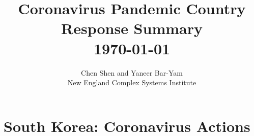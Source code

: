 \documentclass[onecolumn,journal]{IEEEtran}
\begin{document}
\title{\color{Brown} Coronavirus Pandemic Country Response Summary \\ \today \vspace{-0.35ex}}
\author{Chen Shen and Yaneer Bar-Yam \\ New England Complex Systems Institute  
  \vspace{-10ex} \\ 
   
   
\bigskip
\textbf{}
 }
    
\maketitle


\flushbottom %



\thispagestyle{empty} %







\section*{South Korea: Coronavirus Actions}
\end{document}
